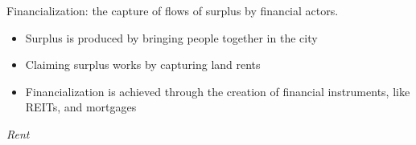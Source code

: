 \documentclass[]{beamer} %
\begin{document}
{
\begin{frame}[noframenumbering]
\titlepage
\end{frame}}

\begin{frame}{Financialization: 
the capture of flows of surplus by financial actors.}
\begin{itemize} \Large 
    \item Surplus is produced by bringing people together in the city 
    \item Claiming surplus works by capturing land rents %
    \item Financialization is achieved through the creation of financial instruments, like REITs, and mortgages 
\end{itemize}

\end{frame}

\begin{frame}
\begin{figure}[!ht]
\centering
\resizebox{0.85\textwidth}{!}{}
\label{fig:fieldsplus}
\end{figure}
\end{frame}





\begin{frame}{}
  \centering \Huge
  \emph{Rent}
  
  
\end{frame}
\end{document}
